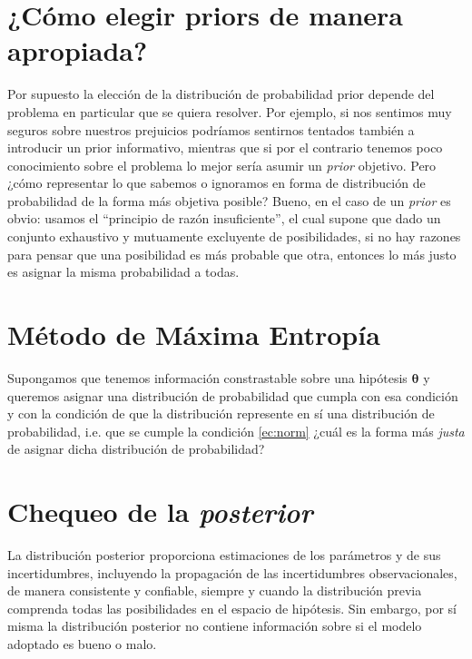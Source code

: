 \documentclass[a4paper,twoside]{article}
\newcommand{\hip}{\ensuremath{\mathbold{\theta}}\xspace}
\begin{document}
\section{¿Cómo elegir priors de manera apropiada?}
%
Por supuesto la elección de la distribución de probabilidad prior depende del problema en particular
que se quiera resolver. Por ejemplo, si nos sentimos muy seguros sobre nuestros prejuicios podríamos
sentirnos tentados también a introducir un prior informativo, mientras que si por el contrario
tenemos poco conocimiento sobre el problema lo mejor sería asumir un \emph{prior} objetivo. Pero
¿cómo representar lo que sabemos o ignoramos en forma de distribución de probabilidad de la forma
más objetiva posible? Bueno, en el caso de un \emph{prior} es obvio: usamos el ``principio de razón
insuficiente'', el cual supone que dado un conjunto exhaustivo y mutuamente excluyente de
posibilidades, si no hay razones para pensar que una posibilidad es más probable que otra, entonces
lo más justo es asignar la misma probabilidad a todas.


\section{Método de Máxima Entropía}\label{sc:me-method}

Supongamos que tenemos información constrastable sobre una hipótesis \(\hip\) y queremos asignar una
distribución de probabilidad que cumpla con esa condición y con la condición de que la distribución
represente en sí una distribución de probabilidad, i.e. que se cumple la condición \eqref{ec:norm}
¿cuál es la forma más \emph{justa} de asignar dicha distribución de probabilidad?


\section{Chequeo de la \emph{posterior}}

La distribución posterior proporciona estimaciones de los parámetros y de sus incertidumbres,
incluyendo la propagación de las incertidumbres observacionales, de manera consistente y confiable,
siempre y cuando la distribución previa comprenda todas las posibilidades en el espacio de
hipótesis. Sin embargo, por sí misma la distribución posterior no contiene información sobre si el
modelo adoptado es bueno o malo.
\end{document}
